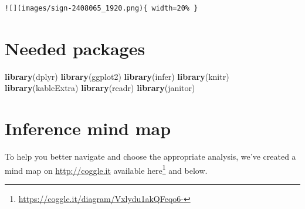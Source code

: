 \documentclass[12pt,]{krantz}
\makeatletter
\newenvironment{Shaded}{\begin{snugshade}}{\end{snugshade}}
\newcommand{\KeywordTok}[1]{\textcolor[rgb]{0.27,0.27,0.27}{\textbf{#1}}}
\newcommand{\NormalTok}[1]{#1}
\renewcommand{\href}[2]{#2\footnote{\url{#1}}}
\newenvironment{kframe}{%
\medskip{}
\setlength{\fboxsep}{.8em}
 \def\at@end@of@kframe{}%
 \ifinner\ifhmode%
  \def\at@end@of@kframe{\end{minipage}}%
  \begin{minipage}{\columnwidth}%
 \fi\fi%
 \def\FrameCommand##1{\hskip\@totalleftmargin \hskip-\fboxsep
 \colorbox{shadecolor}{##1}\hskip-\fboxsep
     \hskip-\linewidth \hskip-\@totalleftmargin \hskip\columnwidth}%
 \MakeFramed {\advance\hsize-\width
   \@totalleftmargin\z@ \linewidth\hsize
   \@setminipage}}%
 {\par\unskip\endMakeFramed%
 \at@end@of@kframe}
\renewenvironment{Shaded}{\begin{kframe}}{\end{kframe}}
\makeatother
\begin{document}
\begin{verbatim}
![](images/sign-2408065_1920.png){ width=20% }
\end{verbatim}

\section*{Needed packages}\label{needed-packages-10}


\begin{Shaded}
\begin{Highlighting}[]
\KeywordTok{library}\NormalTok{(dplyr)}
\KeywordTok{library}\NormalTok{(ggplot2)}
\KeywordTok{library}\NormalTok{(infer)}
\KeywordTok{library}\NormalTok{(knitr)}
\KeywordTok{library}\NormalTok{(kableExtra)}
\KeywordTok{library}\NormalTok{(readr)}
\KeywordTok{library}\NormalTok{(janitor)}
\end{Highlighting}
\end{Shaded}

\section{Inference mind map}\label{inference-mind-map}

To help you better navigate and choose the appropriate analysis, we've
created a mind map on \url{http://coggle.it} available
\href{https://coggle.it/diagram/Vxlydu1akQFeqo6-}{here} and below.
\end{document}

